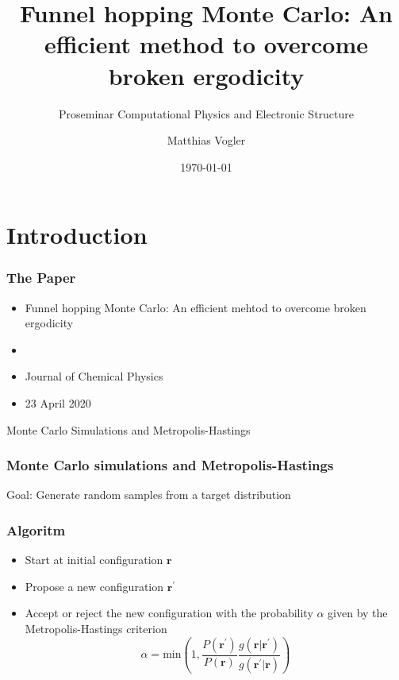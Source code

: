 \documentclass{beamer}
\title{Funnel hopping Monte Carlo: An efficient method to overcome broken ergodicity}
\subtitle{Proseminar Computational Physics and Electronic Structure}
\date{\today}
\author{Matthias Vogler}
\institute{Departement of Physics\\ University of Basel}
\begin{document}
  \maketitle
  \section{Introduction}
  \begin{frame}
  \frametitle{The Paper}
   	\begin{itemize}
   		\item Funnel hopping Monte Carlo: An efficient mehtod to overcome broken ergodicity \cite{Finkler2020}
   		\item \citeauthor{Finkler2020} 
   		\item Journal of Chemical Physics
   		\item 23 April 2020

   	\end{itemize}
  \end{frame}

  \begin{frame}
  	\begin{center}
  		\huge
  		Monte Carlo Simulations and Metropolis-Hastings
  	\end{center}

  \end{frame}

  \begin{frame}
  	\frametitle{Monte Carlo simulations and Metropolis-Hastings}
  	\large Goal: Generate random samples from a target distribution \\
  	\subsubsection{Algoritm}
  	\begin{itemize}
  		\item Start at initial configuration $\mathbf{r}$
  		\item Propose a new configuration $\mathbf{r}^\prime$
  		\item Accept or reject the new configuration with the probability $\alpha$ given by the Metropolis-Hastings criterion \cite{Hastings1970}
  		\begin{equation}
  		\alpha = \text{min}\left(1,\frac{P(\mathbf{r}^\prime)}{P(\mathbf{r})}\frac{g(\mathbf{r}|\mathbf{r}^\prime)}{g(\mathbf{r}^\prime|\mathbf{r})}\right)
  		\end{equation}
  	\end{itemize}
  \end{frame}
\end{document}
